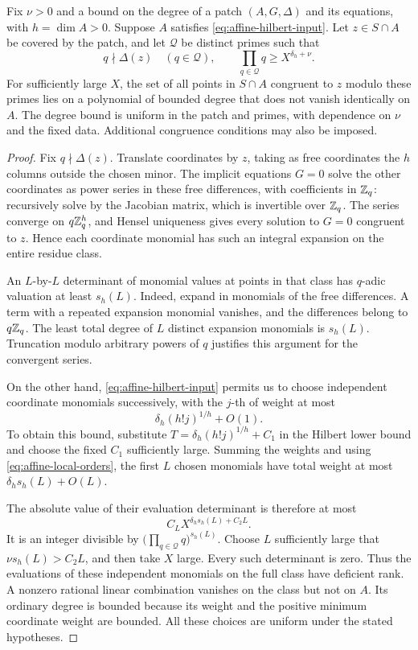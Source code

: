 \begin{lemma}\label{lem:affine-residue-cut}
Fix $\nu>0$ and a bound on the degree of a patch $(A,G,\Delta)$ and
its equations, with $h=\dim A>0$.  Suppose $A$ satisfies
\eqref{eq:affine-hilbert-input}.  Let $z\in S\cap A$ be covered by the
patch, and let $\mathcal Q$ be distinct primes such that
\[
 q\nmid\Delta(z)\quad(q\in\mathcal Q),\qquad
 \prod_{q\in\mathcal Q}q\ge X^{\delta_h+\nu}.
\]
For sufficiently large $X$, the set of all points in $S\cap A$
congruent to $z$ modulo these primes lies on a polynomial of bounded
degree that does not vanish identically on $A$.  The degree bound is
uniform in the patch and primes, with dependence on $\nu$ and the
fixed data.  Additional congruence conditions may also be imposed.
\end{lemma}

\begin{proof}
Fix $q\nmid\Delta(z)$.  Translate coordinates by $z$, taking as free
coordinates the $h$ columns outside the chosen minor.  The implicit
equations $G=0$ solve the other coordinates as power series in these
free differences, with coefficients in $\mathbb Z_q$: recursively solve by
the Jacobian matrix, which is invertible over $\mathbb Z_q$.  The series
converge on $q\mathbb Z_q^h$, and Hensel uniqueness gives every solution to
$G=0$ congruent to $z$.  Hence each coordinate monomial has such an
integral expansion on the entire residue class.

An $L$-by-$L$ determinant of monomial values at points in that class
has $q$-adic valuation at least $s_h(L)$.  Indeed, expand in monomials
of the free differences.  A term with a repeated expansion monomial
vanishes, and the differences belong to $q\mathbb Z_q$.  The least total
degree of $L$ distinct expansion monomials is $s_h(L)$.  Truncation
modulo arbitrary powers of $q$ justifies this argument for the
convergent series.

On the other hand, \eqref{eq:affine-hilbert-input} permits us to choose
independent coordinate monomials successively, with the $j$-th of
weight at most
\[
 \delta_h(h!j)^{1/h}+O(1).
\]
To obtain this bound, substitute
$T=\delta_h(h!j)^{1/h}+C_1$ in the Hilbert lower bound and choose the
fixed $C_1$ sufficiently large.  Summing the weights and using
\eqref{eq:affine-local-orders}, the first $L$ chosen monomials have
total weight at most $\delta_h s_h(L)+O(L)$.

The absolute value of their evaluation determinant is therefore at
most
\[
 C_L X^{\delta_h s_h(L)+C_2L}.
\]
It is an integer divisible by
$\bigl(\prod_{q\in\mathcal Q}q\bigr)^{s_h(L)}$.
Choose $L$ sufficiently large that $\nu s_h(L)>C_2L$, and then take
$X$ large.  Every such determinant is zero.  Thus the evaluations of
these independent monomials on the full class have deficient rank.
A nonzero rational linear combination vanishes on the class but not
on $A$.  Its ordinary degree is bounded because its weight and the
positive minimum coordinate weight are bounded.  All these choices
are uniform under the stated hypotheses.
\end{proof}

